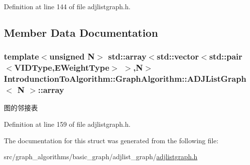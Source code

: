Definition at line 144 of file adjlistgraph.\+h.



\subsection{Member Data Documentation}
\hypertarget{struct_introdunction_to_algorithm_1_1_graph_algorithm_1_1_a_d_j_list_graph_a8474d46cb8dbe93c759752b789941fe5}{}
\subsubsection[{array}]{\setlength{\rightskip}{0pt plus 5cm}template$<$unsigned N$>$ std\+::array$<$std\+::vector$<$std\+::pair$<${\bf V\+I\+D\+Type},{\bf E\+Weight\+Type}$>$ $>$,N$>$ {\bf Introdunction\+To\+Algorithm\+::\+Graph\+Algorithm\+::\+A\+D\+J\+List\+Graph}$<$ N $>$\+::array}\label{struct_introdunction_to_algorithm_1_1_graph_algorithm_1_1_a_d_j_list_graph_a8474d46cb8dbe93c759752b789941fe5}
图的邻接表 

Definition at line 159 of file adjlistgraph.\+h.



The documentation for this struct was generated from the following file\+:\begin{DoxyCompactItemize}
\item 
src/graph\+\_\+algorithms/basic\+\_\+graph/adjlist\+\_\+graph/\hyperlink{adjlistgraph_8h}{adjlistgraph.\+h}\end{DoxyCompactItemize}
